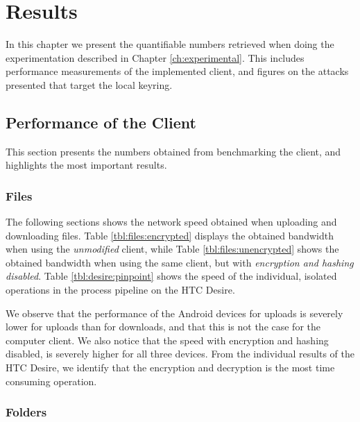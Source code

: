 \documentclass[pdftex,english,10pt,b5paper,twoside]{book}
\begin{document}
\chapter{Results}
\label{ch:results}

In this chapter we present the quantifiable numbers retrieved when doing the
experimentation described in Chapter \ref{ch:experimental}. This includes
performance measurements of the implemented client, and figures on the attacks
presented that target the local keyring.

\section{Performance of the Client}

This section presents the numbers obtained from benchmarking the client, and
highlights the most important results.

\subsection{Files}

The following sections shows the network speed obtained when uploading and
downloading files. Table \ref{tbl:files:encrypted} displays the obtained
bandwidth when using the \emph{unmodified} client, while Table
\ref{tbl:files:unencrypted} shows the obtained bandwidth when using the same
client, but with \emph{encryption and hashing disabled}. Table
\ref{tbl:desire:pinpoint} shows the speed of the individual, isolated
operations in the process pipeline on the HTC Desire.





We observe that the performance of the Android devices for uploads is severely
lower for uploads than for downloads, and that this is not the case for the
computer client. We also notice that the speed with encryption and hashing
disabled, is severely higher for all three devices. From the individual results
of the HTC Desire, we identify that the encryption and decryption is the most
time consuming operation.

\subsection{Folders}
\end{document}
